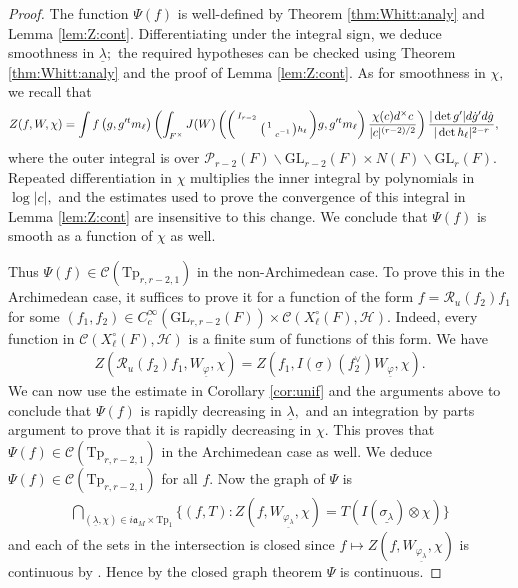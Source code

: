 \documentclass[12pt]{amsart}
\theoremstyle{remark}
\numberwithin{equation}{section}
\newcommand{\GL}{\mathrm{GL}}
\theoremstyle{definition}
\newenvironment{psmatrix}
  {\left(\begin{smallmatrix}}
  {\end{smallmatrix}\right)}
\numberwithin{equation}{subsection}
\begin{document}
\begin{proof} 
 The function $\Psi(f)$ is well-defined by  Theorem \ref{thm:Whitt:analy} and Lemma \ref{lem:Z:cont}. 
Differentiating under the integral sign, we deduce smoothness in $\underline{\lambda};$ the required hypotheses can be checked using Theorem \ref{thm:Whitt:analy} and the proof of Lemma \ref{lem:Z:cont}.  
 As for smoothness in $\chi,$ we recall that 
 \begin{align*}
 Z(f,W,\chi)&=
     \int f\left(g,g'^tm_{\ell}\right)\left(\int_{F^\times} J(W)\left(\begin{psmatrix}
        I_{r-2} & \\
           & \begin{psmatrix} 1 & \\ & c^{-1}\end{psmatrix}h_\ell
\end{psmatrix}g,g'^tm_\ell\right)\frac{\chi(c)d^\times c}{|c|^{(r-2)/2}}\right)\frac{|\det g'|d\dot{g}'d\dot{g}}{|\det h_\ell|^{2-r}},
 \end{align*}
 where the outer integral is over $\mathcal{P}_{r-2}(F) \backslash \GL_{r-2}(F) \times N(F) \backslash \GL_r(F).$
Repeated differentiation in $\chi$ multiplies
 the inner integral by polynomials in $\log |c|,$ and the estimates used to prove the convergence of this integral in Lemma \ref{lem:Z:cont} are insensitive to this change. We conclude that $\Psi(f)$ is smooth as a function of $\chi$ as well.
 
 Thus $\Psi(f) \in \mathcal{C}(\mathrm{Tp}_{r,r-2,1})$ in the non-Archimedean case.  To prove this in the Archimedean case, it suffices to prove it for a function of the form
 $
 f=\mathcal{R}_u(f_2)f_1
 $
 for some $(f_1,f_2) \in C_c^\infty(\GL_{r,r-2}(F)) \times \mathcal{C}(X_\ell^{\circ}(F),\mathcal{H}).$  Indeed, every function in $\mathcal{C}(X_\ell^{\circ}(F),\mathcal{H})$ is a finite sum of functions of this form.  We have
 \begin{align*}
Z(\mathcal{R}_u(f_2)f_1,W_{\underline{\varphi}},\chi)=Z(f_1,I(\underline{\sigma})(f^\vee_2)W_{\underline{\varphi}},\chi).
\end{align*} 
We can now use the estimate in Corollary \ref{cor:unif} and the arguments above to conclude that $\Psi(f)$ is rapidly decreasing in $\underline{\lambda},$ and an integration by parts argument to prove that it is rapidly decreasing in $\chi.$ This proves that $\Psi(f) \in \mathcal{C}(\mathrm{Tp}_{r,r-2,1})$ in the Archimedean case as well.  We deduce $\Psi(f) \in \mathcal{C}(\mathrm{Tp}_{r,r-2,1})$ for all $f.$ 
Now the graph of $\Psi$ is
\begin{align*}
    \bigcap_{(\underline{\lambda},\chi) \in i\mathfrak{a}_M \times \mathrm{Tp}_1}\{(f,T):Z(f,W_{\underline{\varphi_\lambda}},\chi)=T(I(\underline{\sigma_{\lambda}}) \otimes \chi)\}
\end{align*}
and each of the sets in the intersection is closed since $f \mapsto Z(f,W_{\underline{\varphi_\lambda}},\chi)$ is continuous by .  Hence by the closed graph theorem \cite[Theorem 2]{Robertson:Robertson}  $\Psi$ is continuous.
\end{proof}
\end{document}
